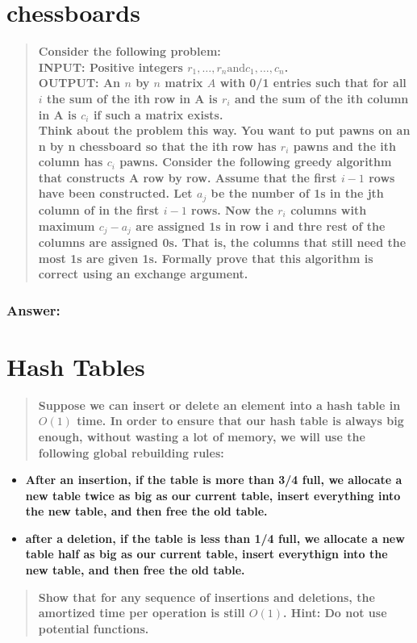 \documentclass[titlepage]{article}\usepackage[]{graphicx}\usepackage[]{color}
\begin{document}
\section{chessboards}

\begin{quote}
  \textbf{Consider the following problem: \\
	INPUT: Positive integers $r_1, \dots , r_n \text{and} c_1, \dots , c_n$. \\
	OUTPUT: An $n$ by $n$ matrix $A$ with 0/1 entries such that for all $i$ the
	sum of the ith row in A is $r_i$ and the sum of the ith column in A is
	$c_i$ if such a matrix exists. \\
	Think about the problem this way. You want to put pawns on an n by n
	chessboard so that the ith row has $r_i$ pawns and the ith column has $c_i$
	pawns. Consider the following greedy algorithm that constructs A row by
	row. Assume that the first $i - 1$ rows have been constructed. Let $a_j$ be
	the number of 1s in the jth column of in the first $i-1$ rows. Now the
	$r_i$ columns with maximum $c_j - a_j$ are assigned 1s in row i and thre
	rest of the columns are assigned 0s. That is, the columns that still need
	the most 1s are given 1s. Formally prove that this algorithm is correct
  using an exchange argument.}
\end{quote}


\subsubsection{Answer: }

\section{Hash Tables}
\begin{quote}
  \textbf{Suppose we can insert or delete an element into a hash table in
	$O(1)$ time. In order to ensure that our hash table is always big enough,
	without wasting a lot of memory, we will use the following global
  rebuilding rules:}
\end{quote}

\begin{itemize}
	\item \textbf{After an insertion, if the table is more than 3/4 full, we
			allocate a new table twice as big as our current table, insert
		everything into the new table, and then free the old table.}
	\item \textbf{ after a deletion, if the table is less than 1/4 full, we
			allocate a new table half as big as our current table, insert
		everythign into the new table, and then free the old table.}
\end{itemize}
\begin{quote}
	\textbf{Show that for any sequence of insertions and deletions, the
		amortized time per operation is still $O(1)$. Hint: Do not use
	potential functions.}
\end{quote}
\end{document}
